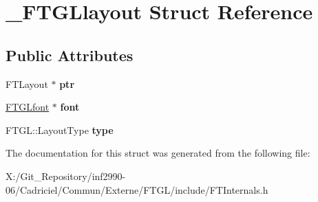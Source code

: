 \hypertarget{struct___f_t_g_llayout}{\section{\-\_\-\-F\-T\-G\-Llayout Struct Reference}
\label{struct___f_t_g_llayout}
}
\subsection*{Public Attributes}
\begin{DoxyCompactItemize}
\item 
\hypertarget{struct___f_t_g_llayout_aa005e0b4dbed84077bc849aee6cc072a}{F\-T\-Layout $\ast$ {\bfseries ptr}}\label{struct___f_t_g_llayout_aa005e0b4dbed84077bc849aee6cc072a}

\item 
\hypertarget{struct___f_t_g_llayout_a85b58d0b7343ae0b396417b3cf74ce06}{\hyperlink{struct___f_t_g_lfont}{F\-T\-G\-Lfont} $\ast$ {\bfseries font}}\label{struct___f_t_g_llayout_a85b58d0b7343ae0b396417b3cf74ce06}

\item 
\hypertarget{struct___f_t_g_llayout_ace10a672a5f6d779ede1c6dfba6096f2}{F\-T\-G\-L\-::\-Layout\-Type {\bfseries type}}\label{struct___f_t_g_llayout_ace10a672a5f6d779ede1c6dfba6096f2}

\end{DoxyCompactItemize}


The documentation for this struct was generated from the following file\-:\begin{DoxyCompactItemize}
\item 
X\-:/\-Git\-\_\-\-Repository/inf2990-\/06/\-Cadriciel/\-Commun/\-Externe/\-F\-T\-G\-L/include/F\-T\-Internals.\-h\end{DoxyCompactItemize}
